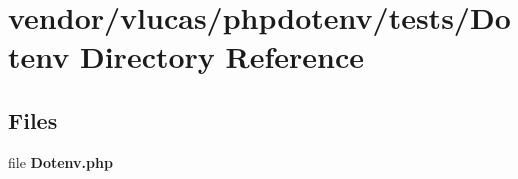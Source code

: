\section{vendor/vlucas/phpdotenv/tests/\+Dotenv Directory Reference}
\label{dir_93774d0ee00aa3a669e16b7ac87a0ee9}
\subsection*{Files}
\begin{DoxyCompactItemize}
\item 
file {\bf Dotenv.\+php}
\end{DoxyCompactItemize}
